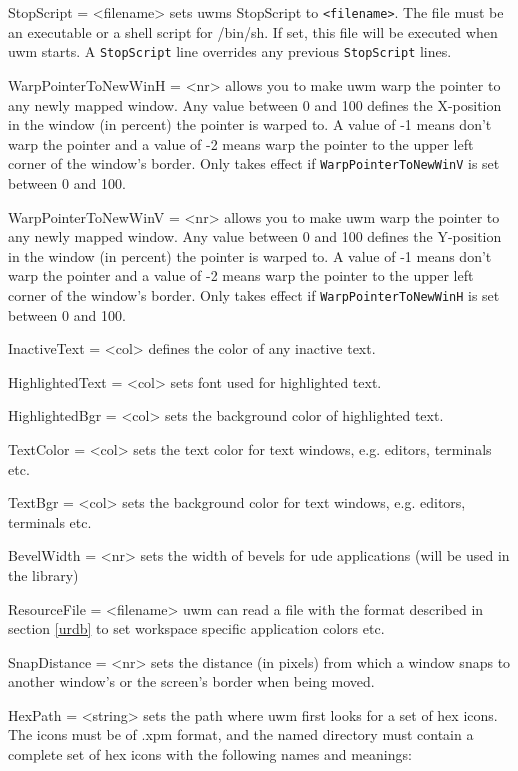 \documentclass[10pt,a4paper]{article}
\newenvironment{ttdesc}[1]{
   \begin{list}{}{
          \renewcommand{\makelabel}[1]{\texttt{##1\hfill}}}}{\end{list}}
\begin{document}
\begin{ttdesc}{description}
\item[StopScript = <filename>] sets uwms StopScript to \texttt{<filename>}. The file must be an executable or a shell script for /bin/sh. If set, this file will be executed when uwm starts. A \texttt{StopScript} line overrides any previous \texttt{StopScript} lines.

\item[WarpPointerToNewWinH = <nr>] allows you to make uwm warp the pointer to any newly mapped window. Any value between 0 and 100 defines the X-position in the window (in percent) the pointer is warped to. A value of -1 means don't warp the pointer and a value of -2 means warp the pointer to the upper left corner of the window's border. Only takes effect if \texttt{WarpPointerToNewWinV} is set between 0 and 100.
\item[WarpPointerToNewWinV = <nr>] allows you to make uwm warp the pointer to any newly mapped window. Any value between 0 and 100 defines the Y-position in the window (in percent) the pointer is warped to. A value of -1 means don't warp the pointer and a value of -2 means warp the pointer to the upper left corner of the window's border. Only takes effect if \texttt{WarpPointerToNewWinH} is set between 0 and 100.
\item[InactiveText = <col>] defines the color of any inactive text.
\item[HighlightedText = <col>] sets font used for highlighted text.
\item[HighlightedBgr = <col>] sets the background color of highlighted text.
\item[TextColor = <col>] sets the text color for text windows, e.g. editors, terminals etc.
\item[TextBgr = <col>] sets the background color for text windows, e.g. editors, terminals etc.
\item[BevelWidth = <nr>] sets the width of bevels for ude applications (will be used in the library)
\item[ResourceFile = <filename>] uwm can read a file with the format described in section \ref{urdb} to set workspace specific application colors etc.
\item[SnapDistance = <nr>] sets the distance (in pixels) from which a window snaps to another window's or the screen's border when being moved.
\item[HexPath = <string>] sets the path where uwm first looks for a set of hex icons. The icons must be of \textsf{.xpm} format, and the named directory must contain a complete set of hex icons with the following names and meanings:\\

\end{ttdesc}
\end{document}

